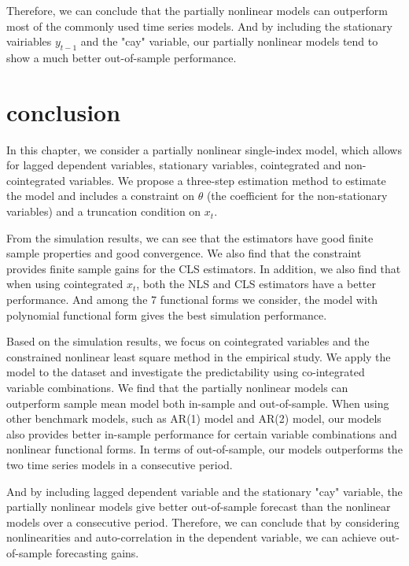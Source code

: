 \documentclass[a4paper,12pt,times,numbered,print,index]{report}
\numberwithin{equation}{section}
\begin{document}
Therefore, we can conclude that the partially nonlinear models can outperform most of the commonly used time series models. And by including the stationary vairiables $y_{t-1}$ and the "cay" variable, our partially nonlinear models tend to show a much better out-of-sample performance.

\section{conclusion}
In this chapter, we consider a partially nonlinear single-index model, which allows for lagged dependent variables, stationary variables, cointegrated and non-cointegrated variables. We propose a three-step estimation method to estimate the model and includes a constraint on $\theta$ (the coefficient for the non-stationary variables) and a truncation condition on $x_t$. 

From the simulation results, we can see that the estimators have good finite sample properties and good convergence. We also find that the constraint provides finite sample gains for the CLS estimators. In addition, we also find that when using cointegrated $x_t$, both the NLS and CLS estimators have a better performance. And among the 7 functional forms we consider, the model with polynomial functional form  gives the best simulation performance. 

Based on the simulation results, we focus on cointegrated variables and the constrained nonlinear least square method in the empirical study. We apply the model to the \cite{welch2008comprehensive} dataset and investigate the predictability using co-integrated variable combinations. We find that the partially nonlinear models can outperform sample mean model both in-sample and out-of-sample. When using other benchmark models, such as AR(1) model and AR(2) model, our models also provides better in-sample performance for certain variable combinations and nonlinear functional forms. In terms of out-of-sample, our models outperforms the two time series models in a consecutive period. 

And by including lagged dependent variable and the stationary "cay" variable, the partially nonlinear models give better out-of-sample forecast than the nonlinear models over a consecutive period. Therefore, we can conclude that by considering nonlinearities and auto-correlation in the dependent variable, we can achieve out-of-sample forecasting gains.
\end{document}
